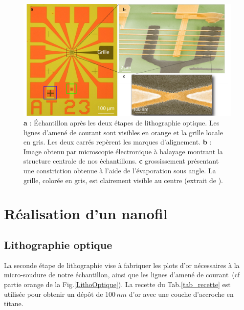 \begin{figure}
\centering \includegraphics[scale=0.45]{Fabrication/FinalResult/FinalResult.pdf}
\caption{\textbf{a} : Échantillon après les deux étapes de lithographie optique. Les lignes d'amené de courant sont visibles en orange et la grille locale en gris. Les deux carrés repèrent les marques d'alignement. \textbf{b} : Image obtenu par microscopie électronique à balayage montrant la structure centrale de nos échantillons. \textbf{c} grossissement présentant une constriction obtenue à l'aide de l'évaporation sous angle. La grille, colorée en gris, est clairement visible au centre (extrait de \cite{RochPhD}).}
\label{FinalResult}
\end{figure}






\section{Réalisation d'un nanofil}

\subsection{Lithographie optique}

La seconde étape de lithographie vise à fabriquer les plots d'or nécessaires à la micro-soudure de notre échantillon, ainsi que les lignes d'amené de courant~(cf partie orange de la Fig.\ref{LithoOptique}). La recette du Tab.\ref{tab_recette}  est utilisée pour obtenir un dép\^ot de 100$\,nm$ d'or avec une couche d'accroche en titane. 



